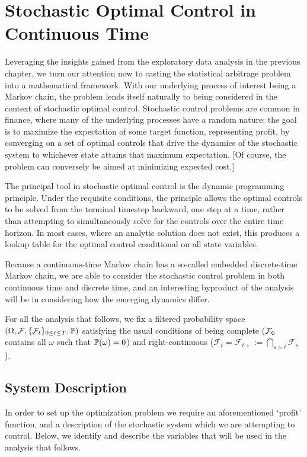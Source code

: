 \chapter{Stochastic Optimal Control in Continuous Time}
Leveraging the insights gained from the exploratory data analysis in the previous chapter, we turn our attention now to casting the statistical arbitrage problem into a mathematical framework. With our underlying process of interest being a Markov chain, the problem lends itself naturally to being considered in the context of stochastic optimal control. Stochastic control problems are common in finance, where many of the underlying processes have a random nature; the goal is to maximize the expectation of some target function, representing profit, by converging on a set of optimal controls that drive the dynamics of the stochastic system to whichever state attains that maximum expectation. [Of course, the problem can conversely be aimed at minimizing expected cost.]

The principal tool in stochastic optimal control is the dynamic programming principle. Under the requisite conditions, the principle allows the optimal controls to be solved from the terminal timestep backward, one step at a time, rather than attempting to simultaneously solve for the controls over the entire time horizon. In most cases, where an analytic solution does not exist, this produces a lookup table for the optimal control conditional on all state variables. 

Because a continuous-time Markov chain has a so-called embedded discrete-time Markov chain, we are able to consider the stochastic control problem in both continuous time and discrete time, and an interesting byproduct of the analysis will be in considering how the emerging dynamics differ.

For all the analysis that follows, we fix a filtered probability space $( \Omega, \cF, \{ \cF_t \}_{0 \leq t \leq T}, \P )$ satisfying the usual conditions of being complete ($\cF_0$ contains all $\omega$ such that $\P(\omega) = 0$) and right-continuous ($\mathcal{F}_t = \mathcal{F}_{t+} := \bigcap_{s > t} \mathcal{F}_s$).

\section{System Description}
In order to set up the optimization problem we require an aforementioned `profit' function, and a description of the stochastic system which we are attempting to control. Below, we identify and describe the variables that will be used in the analysis that follows.

